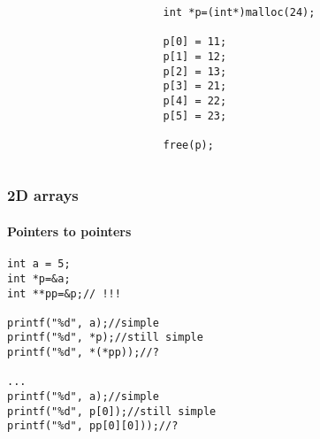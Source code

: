 \documentclass[10pt]{beamer}
\begin{document}
\begin{frame}[fragile]
\begin{columns}
\begin{column}{0.65\textwidth}
    \end{column}
    \begin{column}{0.55\textwidth}

\begin{lstlisting}
int *p=(int*)malloc(24);

p[0] = 11;
p[1] = 12;
p[2] = 13;
p[3] = 21;
p[4] = 22;
p[5] = 23;

free(p);
\end{lstlisting}

    \end{column}
  \end{columns}
\end{frame}

\begin{frame}[fragile]
  \frametitle{2D arrays}
  \framesubtitle{Pointers to pointers}  
  \vspace{-0.3cm}


\begin{lstlisting}
int a = 5;
int *p=&a;
int **pp=&p;// !!!

printf("%d", a);//simple
printf("%d", *p);//still simple
printf("%d", *(*pp));//?

...
printf("%d", a);//simple
printf("%d", p[0]);//still simple
printf("%d", pp[0][0]));//?

\end{lstlisting}

\end{frame}
\end{document}
